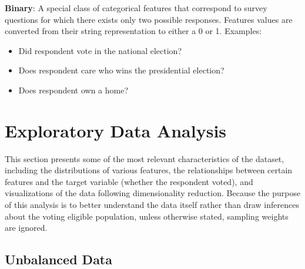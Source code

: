 \documentclass{article}
\begin{document}
\begin{enumerate}
{{			}
			\item{\textbf{Binary}:} A special class of categorical features that correspond to survey questions for which there exists only two possible responses. Features values are converted from their string representation to either a 0 or 1. Examples:
				\begin{itemize}
					\item{Did respondent vote in the national election?}
					\item{Does respondent care who wins the presidential election?}
					\item{Does respondent own a home?}
				\end{itemize}
		}
	\end{enumerate}

	\section{Exploratory Data Analysis}
	
	This section presents some of the most relevant characteristics of the dataset, including the distributions of various features, the relationships between certain features and the target variable (whether the respondent voted), and visualizations of the data following dimensionality reduction. Because the purpose of this analysis is to better understand the data itself rather than draw inferences about the voting eligible population, unless otherwise stated, sampling weights are ignored.
	
	\subsection{Unbalanced Data}
	
\end{document}
